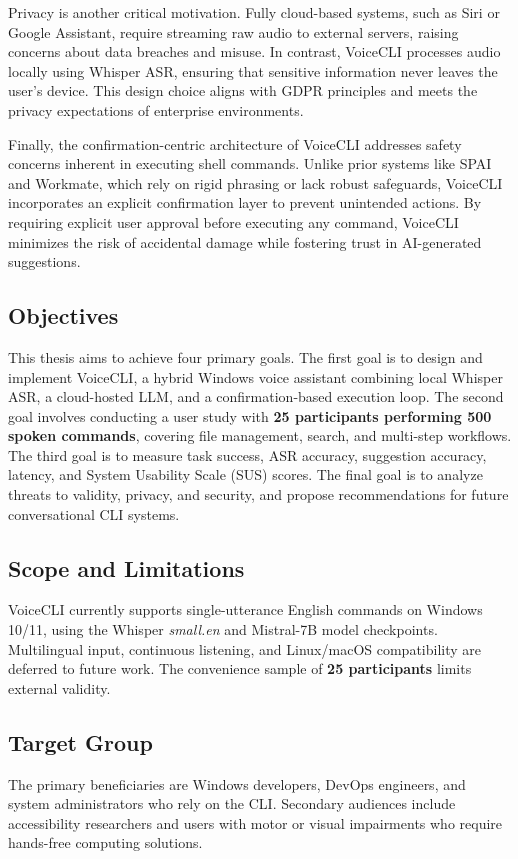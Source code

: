 \documentclass[a4paper,12pt]{article}
\begin{document}
Privacy is another critical motivation. Fully cloud-based systems, such as Siri or Google Assistant, require streaming raw audio to external servers, raising concerns about data breaches and misuse. In contrast, VoiceCLI processes audio locally using Whisper ASR, ensuring that sensitive information never leaves the user's device. This design choice aligns with GDPR principles and meets the privacy expectations of enterprise environments.

Finally, the confirmation-centric architecture of VoiceCLI addresses safety concerns inherent in executing shell commands. Unlike prior systems like SPAI and Workmate, which rely on rigid phrasing or lack robust safeguards, VoiceCLI incorporates an explicit confirmation layer to prevent unintended actions. By requiring explicit user approval before executing any command, VoiceCLI minimizes the risk of accidental damage while fostering trust in AI-generated suggestions.


 

\subsection{Objectives}
\noindent This thesis aims to achieve four primary goals. The first goal is to design and implement VoiceCLI, a hybrid Windows voice assistant combining local Whisper ASR, a cloud-hosted LLM, and a confirmation-based execution loop. The second goal involves conducting a user study with \textbf{25 participants performing 500 spoken commands}, covering file management, search, and multi-step workflows. The third goal is to measure task success, ASR accuracy, suggestion accuracy, latency, and System Usability Scale (SUS) scores. The final goal is to analyze threats to validity, privacy, and security, and propose recommendations for future conversational CLI systems.

\subsection{Scope and Limitations}
\noindent VoiceCLI currently supports single-utterance English commands on Windows 10/11, using the Whisper \textit{small.en} and Mistral-7B model checkpoints. Multilingual input, continuous listening, and Linux/macOS compatibility are deferred to future work. The convenience sample of \textbf{25 participants} limits external validity.

\subsection{Target Group}
\noindent The primary beneficiaries are Windows developers, DevOps engineers, and system administrators who rely on the CLI. Secondary audiences include accessibility researchers and users with motor or visual impairments who require hands-free computing solutions.
\end{document}
